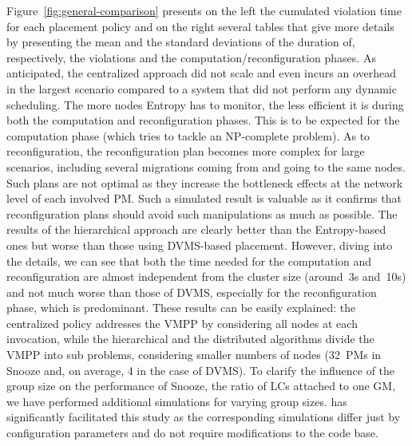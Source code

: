 Figure~\ref{fig:general-comparison} presents on the left the cumulated
violation time for each placement policy and on the right several
tables that give more details by presenting the mean and the standard
deviations of the duration of, respectively, the violations and the
computation/reconfiguration phases. As anticipated, the centralized
approach did not scale and even incurs an overhead in the largest
scenario compared to a system that did not perform any dynamic
scheduling. The more nodes Entropy has to monitor, the less efficient
it is during both the computation and reconfiguration phases.
This is to be expected for the computation phase (which tries to
tackle an NP-complete problem).  As to reconfiguration,
the reconfiguration plan becomes more complex for large scenarios,
including several migrations coming from and going to the same
nodes. Such plans are not optimal as they increase the bottleneck
effects at the network level of each involved PM. Such a simulated
result is valuable as it confirms that reconfiguration plans should
avoid such manipulations as much as possible.
%
The results of the hierarchical approach are clearly better than the
Entropy-based ones but worse than those using DVMS-based
placement. However, diving into the details, we can see that both the
time needed for the computation and reconfiguration are almost
independent from the cluster size (around~3s and~10s) and not much
worse than those of DVMS, especially for the reconfiguration phase,
which is predominant. These results can be easily explained: the
centralized policy addresses the VMPP by considering all nodes at each
invocation, while the hierarchical and the distributed algorithms
divide the VMPP into sub problems, considering smaller numbers of
nodes (32~PMs in Snooze and, on average, 4 in the case of DVMS). To
clarify the influence of the group size on the performance of Snooze,
\ie the ratio of LCs attached to one GM, we have performed additional
simulations for varying group sizes.  \vmps has significantly
facilitated this study as the corresponding simulations differ just by
configuration parameters and do not require modifications to the code
base.


